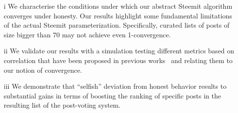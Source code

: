 \begin{itemize}
\item[i] We characterise the conditions under which our abstract Steemit algorithm converges under honesty. Our results highlight some fundamental limitations of the actual Steemit parameterization. Specifically, curated lists of posts of size bigger than 70 may not achieve even 1-convergence.
\item[ii]
We validate our results with a simulation testing different metrics based on correlation that have been proposed in previous works~\cite{kendall1955rank,spearman1904proof} and relating them to our notion of convergence.
\item[iii]
We demonstrate that ``selfish'' deviation from honest behavior results to substantial gains in terms of boosting the ranking of specific posts in the resulting list of the post-voting system.
\end{itemize}





